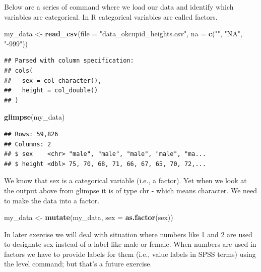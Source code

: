 \documentclass[
]{krantz}
\makeatletter
\newenvironment{Shaded}{\begin{snugshade}}{\end{snugshade}}
\newcommand{\DataTypeTok}[1]{\textcolor[rgb]{0.27,0.27,0.27}{#1}}
\newcommand{\KeywordTok}[1]{\textcolor[rgb]{0.27,0.27,0.27}{\textbf{#1}}}
\newcommand{\NormalTok}[1]{#1}
\newcommand{\StringTok}[1]{\textcolor[rgb]{0.5,0.5,0.5}{#1}}
\newenvironment{kframe}{%
\medskip{}
\setlength{\fboxsep}{.8em}
 \def\at@end@of@kframe{}%
 \ifinner\ifhmode%
  \def\at@end@of@kframe{\end{minipage}}%
  \begin{minipage}{\columnwidth}%
 \fi\fi%
 \def\FrameCommand##1{\hskip\@totalleftmargin \hskip-\fboxsep
 \colorbox{shadecolor}{##1}\hskip-\fboxsep
     \hskip-\linewidth \hskip-\@totalleftmargin \hskip\columnwidth}%
 \MakeFramed {\advance\hsize-\width
   \@totalleftmargin\z@ \linewidth\hsize
   \@setminipage}}%
 {\par\unskip\endMakeFramed%
 \at@end@of@kframe}
\renewenvironment{Shaded}{\begin{kframe}}{\end{kframe}}
\makeatother
\begin{document}
Below are a series of command where we load our data and identify which variables are categorical. In R categorical variables are called factors.

\begin{Shaded}
\begin{Highlighting}[]
\NormalTok{my_data <-}\StringTok{ }\KeywordTok{read_csv}\NormalTok{(}\DataTypeTok{file =} \StringTok{"data_okcupid_heights.csv"}\NormalTok{, }
                    \DataTypeTok{na =} \KeywordTok{c}\NormalTok{(}\StringTok{""}\NormalTok{, }\StringTok{"NA"}\NormalTok{, }\StringTok{"-999"}\NormalTok{))}
\end{Highlighting}
\end{Shaded}

\begin{verbatim}
## Parsed with column specification:
## cols(
##   sex = col_character(),
##   height = col_double()
## )
\end{verbatim}

\begin{Shaded}
\begin{Highlighting}[]
\KeywordTok{glimpse}\NormalTok{(my_data)}
\end{Highlighting}
\end{Shaded}

\begin{verbatim}
## Rows: 59,826
## Columns: 2
## $ sex    <chr> "male", "male", "male", "male", "ma...
## $ height <dbl> 75, 70, 68, 71, 66, 67, 65, 70, 72,...
\end{verbatim}

We know that sex is a categorical variable (i.e., a factor). Yet when we look at the output above from glimpse it is of type chr - which means character. We need to make the data into a factor.

\begin{Shaded}
\begin{Highlighting}[]
\NormalTok{my_data <-}\StringTok{ }\KeywordTok{mutate}\NormalTok{(my_data, }\DataTypeTok{sex =} \KeywordTok{as.factor}\NormalTok{(sex))}
\end{Highlighting}
\end{Shaded}

In later exercise we will deal with situation where numbers like 1 and 2 are used to designate sex instead of a label like male or female. When numbers are used in factors we have to provide labels for them (i.e., value labels in SPSS terms) using the level command; but that's a future exercise.
\end{document}
